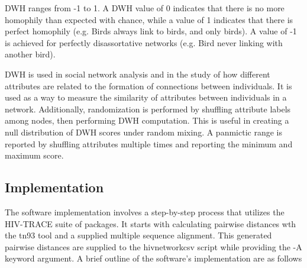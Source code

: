 \documentclass[utf8]{FrontiersinHarvard} %
\begin{document}
DWH ranges from -1 to 1. A DWH value of 0 indicates that there is no more homophily than expected with chance, while a value of 1
indicates that there is perfect homophily (e.g. Birds always link to birds, and only birds). A value of -1 is achieved for perfectly disassortative networks (e.g. Bird never linking with another bird).

DWH is used in social network analysis and in the study of how different
attributes are related to the formation of connections between individuals. It
is used as a way to measure the similarity of attributes between individuals in
a network. Additionally, randomization is performed by shuffling attribute labels among nodes, then performing DWH computation. 
This is useful in creating a null distribution of DWH scores under random
mixing. A panmictic range is reported by shuffling attributes multiple times and
reporting the minimum and maximum score.

\subsection{Implementation}

The software implementation involves a step-by-step process that utilizes the HIV-TRACE suite of packages. It starts with calculating pairwise distances wth the tn93 tool and a supplied multiple sequence alignment. 
This generated pairwise distances are supplied to the hivnetworkcsv script while providing the -A keyword argument. A brief outline of the software's implementation are as follows
\end{document}

